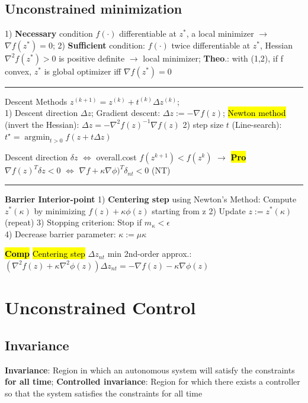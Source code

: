 \documentclass[10pt,a4paper,landscape]{article}
\newcommand{\hlc}[2][yellow]{ {\sethlcolor{#1} \hl{#2}} }
\newcommand{\quadRule}{\vspace{-3pt}\rule{0.23\textwidth}{0.4pt}}
\newcommand{\comp}{\footnotesize{\hlc[cyan]{\textbf{Comp}}}} %
\newcommand{\prove}{\footnotesize{\hlc[pink]{\textbf{Pro}}}} %
\begin{document}
\begin{multicols*}{4}
\subsection{Unconstrained minimization}
1) \textbf{Necessary} condition $f(\cdot)$ differentiable at $z^*$, a local minimizer $\rightarrow$ $\nabla f(z^*)=0$;
2) \textbf{Sufficient} condition: $f(\cdot)$ twice differentiable at $z^*$, Hessian $\nabla^2 f(z^*) >0 $ is positive definite $\rightarrow$ local minimizer;
\textbf{Theo}.: with (1,2), if f convex, $z^*$ is global optimizer iff $\nabla f(z^*)=0$

\quadRule

Descent Methods $z^{(k+1)}=z^{(k)}+t^{(k)} \Delta z^{(k)}$; \\
1) Descent direction $\Delta z$; 
Gradient descent: $\Delta z:=-\nabla f(z)$; 
\hl{Newton method} (invert the Hessian): $\Delta z=-\nabla^{2} f(z)^{-1} \nabla f(z)$ 
2) step size $t$ (Line-search): $t^{\star}=\operatorname{argmin}_{t>0} f(z+t \Delta z)$

Descent direction $\delta z $ $\iff$ overall.cost $f(z^{k+1}) < f(z^{k})$ $\rightarrow$\prove $\nabla f(z)^T \delta z < 0$ $\iff$ $\nabla f+\kappa \nabla \phi)^T \delta_{nt} < 0$ (NT)

\quadRule

\textbf{Barrier Interior-point} 1) \textbf{Centering step} using Newton’s Method: Compute $z^*(\kappa)$ by minimizing
   $f (z) + \kappa \phi(z)$ starting from z
2) Update $z := z^*(\kappa)$ (repeat)
3) Stopping criterion: Stop if $m_{\kappa} < \epsilon$\\
4) Decrease barrier parameter: $\kappa := \mu \kappa$

\comp \hl{Centering step} $\Delta z_{nt}$ min 2nd-order approx.: $\left(\nabla^{2} f(z)+\kappa \nabla^{2} \phi(z)\right) \Delta z_{n t}=-\nabla f(z)-\kappa \nabla \phi(z)$

\section{Unconstrained Control}
\subsection{Invariance}
\textbf{Invariance}: Region in which an autonomous system will satisfy the constraints \textbf{for all time}; \textbf{Controlled invariance}: Region for which there exists a controller so that the system satisfies the constraints for all time


\end{multicols*}
\end{document}

